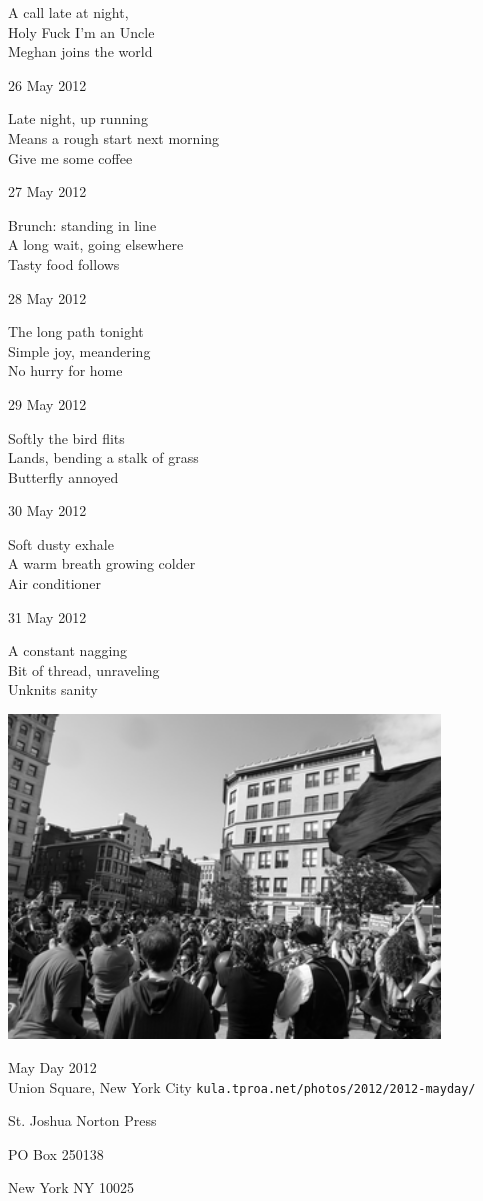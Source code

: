 \documentclass[12pt]{article}
\begin{document}
A call late at night, \\
Holy Fuck I'm an Uncle \\
Meghan joins the world

26 May 2012

Late night, up running \\
Means a rough start next morning \\
Give me some coffee

27 May 2012

Brunch: standing in line \\
A long wait, going elsewhere \\
Tasty food follows

28 May 2012

The long path tonight \\
Simple joy, meandering \\
No hurry for home

29 May 2012

Softly the bird flits \\
Lands, bending a stalk of grass \\
Butterfly annoyed

30 May 2012

Soft dusty exhale \\
A warm breath growing colder \\
Air conditioner

31 May 2012

A constant nagging \\
Bit of thread, unraveling \\
Unknits sanity

\newpage

\begin{center}
\includegraphics[width=325pt]{may-day.png}

May Day 2012 \\
Union Square, New York City
{\tt kula.tproa.net/photos/2012/2012-mayday/ }

\end{center}

\newpage

\thispagestyle{empty}
\vspace*{12cm}
\begin{sideways}
\Large{St. Joshua Norton Press}
\end{sideways}
\begin{sideways}
\Large{PO Box 250138}
\end{sideways}
\begin{sideways}
\Large{New York NY 10025}
\end{sideways}
\end{document}
